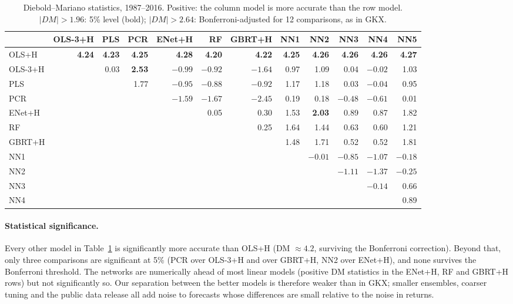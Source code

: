 \documentclass[10pt]{article}
\begin{document}
\begin{table}[t]\centering\scriptsize\setlength{\tabcolsep}{3.2pt}
\caption{Diebold--Mariano statistics, 1987--2016. Positive: the column model is more accurate than the row model.
$|DM|>1.96$: 5\% level (bold); $|DM|>2.64$: Bonferroni-adjusted for 12 comparisons, as in GKX.}\label{tab:dm}
\begin{tabular}{lrrrrrrrrrrr}\toprule
 & OLS-3+H & PLS & PCR & ENet+H & RF & GBRT+H & NN1 & NN2 & NN3 & NN4 & NN5 \\\midrule
OLS+H   & \textbf{4.24} & \textbf{4.23} & \textbf{4.25} & \textbf{4.28} & \textbf{4.20} & \textbf{4.22} & \textbf{4.25} & \textbf{4.26} & \textbf{4.26} & \textbf{4.26} & \textbf{4.27} \\
OLS-3+H &  & 0.03 & \textbf{2.53} & $-0.99$ & $-0.92$ & $-1.64$ & 0.97 & 1.09 & 0.04 & $-0.02$ & 1.03 \\
PLS     &  &  & 1.77 & $-0.95$ & $-0.88$ & $-0.92$ & 1.17 & 1.18 & 0.03 & $-0.04$ & 0.95 \\
PCR     &  &  &  & $-1.59$ & $-1.67$ & $\mathbf{-2.45}$ & 0.19 & 0.18 & $-0.48$ & $-0.61$ & 0.01 \\
ENet+H  &  &  &  &  & 0.05 & 0.30 & 1.53 & \textbf{2.03} & 0.89 & 0.87 & 1.82 \\
RF      &  &  &  &  &  & 0.25 & 1.64 & 1.44 & 0.63 & 0.60 & 1.21 \\
GBRT+H  &  &  &  &  &  &  & 1.48 & 1.71 & 0.52 & 0.52 & 1.81 \\
NN1     &  &  &  &  &  &  &  & $-0.01$ & $-0.85$ & $-1.07$ & $-0.18$ \\
NN2     &  &  &  &  &  &  &  &  & $-1.11$ & $-1.37$ & $-0.25$ \\
NN3     &  &  &  &  &  &  &  &  &  & $-0.14$ & 0.66 \\
NN4     &  &  &  &  &  &  &  &  &  &  & 0.89 \\
\bottomrule\end{tabular}
\end{table}

\paragraph{Statistical significance.} Every other model in Table~\ref{tab:dm} is significantly more accurate than OLS+H (DM $\approx4.2$, surviving the
Bonferroni correction). Beyond that, only three comparisons are significant at 5\% (PCR over OLS-3+H and over GBRT+H, NN2
over ENet+H), and none survives the Bonferroni threshold. The networks are numerically ahead of most linear models (positive
DM statistics in the ENet+H, RF and GBRT+H rows) but not significantly so. Our separation between the better models is
therefore weaker than in GKX; smaller ensembles, coarser tuning and the public data release all add noise to forecasts whose
differences are small relative to the noise in returns.
\end{document}
